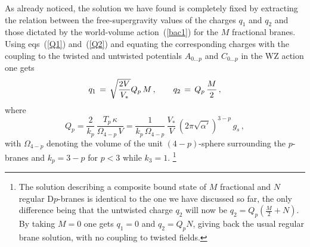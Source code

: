 \documentclass[a4paper,11pt]{article}
\newcommand{\eqref}[1]{(\ref{#1})}
\begin{document}
As already noticed, the solution we have found is completely fixed by
extracting the relation between the free-supergravity values of the
charges $q_1$ and $q_2$ and those dictated by the world-volume
action~\eqref{bac1} for the $M$ fractional branes. Using eqs~\eqref{Q1}
and~\eqref{Q2} and equating the corresponding charges with the coupling
to the twisted and untwisted potentials $A_{0\ldots p}$ and
$C_{0\ldots p}$  in the WZ action one gets
\begin{equation}
\label{q1q2}
q_1 \,=\, \sqrt{\frac{2 V}{V_*}} Q_p\,M \,,\qquad q_2 \,=\, Q_p\,
\frac{M}{2} \,,
\end{equation}
where
\begin{equation}
\label{def1}
Q_p = \frac{2}{k_p}\,\frac{T_p \,\kappa}{\Omega_{4-p}\,V} = 
  \frac{1}{k_p\,\Omega_{4-p}}\,\frac{V_*}{V}\,(2\pi\sqrt{\alpha'})^{3-p}\,g_s
  \,,
\end{equation}
with $\Omega_{4-p}$ denoting the volume of the unit $(4{-}p)$-sphere
surrounding the $p$-branes and $k_p=3-p$ for $p<3$ while $k_3=1$.%
\footnote{The solution describing a composite bound state of $M$
fractional and $N$ regular D$p$-branes is identical to the one we have
discussed so far, the only difference being that the untwisted charge
$q_2$ will now be $q_2 = Q_p (\frac{M}{2} + N)$. By taking $M=0$ one
gets $q_1=0$ and $q_2 = Q_p N$, giving back the usual regular brane
solution, with no coupling to twisted fields.}
\end{document}
